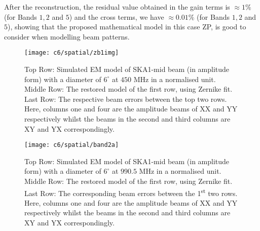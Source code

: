 After the reconstruction, the residual value obtained in the gain terms is $\approx 1 \%$ (for Bands $1, 2$ and $5$) and the cross terms, we have $ \approx 0.01 \%$ (for Bands $1, 2$ and $5$), showing that the proposed mathematical model in this case ZP, is good to consider when modelling beam patterns.
\begin{figure}
\begin{minipage}[H]{\linewidth}
\centering
\texttt{[image: c6/spatial/zb1img]}
\caption{\label{fig:band1} Top Row: Simulated EM model of SKA1-mid beam (in amplitude form) with a diameter of $6^\circ$ at $450$ MHz in a normalised unit. Middle Row: The restored model of the first row, using Zernike fit. Last Row: The respective beam errors between the top two rows.
Here, columns one and four are the amplitude beams of XX and YY respectively whilst the beams in the second and third columns are XY and YX correspondingly.}
\end{minipage}
\end{figure}
\FloatBarrier


\begin{figure}
\begin{minipage}[H]{\linewidth}
\centering
\texttt{[image: c6/spatial/band2a]}
\caption{\label{fig:band2} Top Row: Simulated EM model of SKA1-mid beam (in amplitude form) with a diameter of $6^\circ$ at $990.5$ MHz in a normalised unit. Middle Row: The restored model of the first row, using Zernike fit.
Last Row: The corresponding beam errors between the 1\textsuperscript{st} two rows.
Here, columns one and four are the amplitude beams of XX and YY respectively whilst the beams in the second and third columns are XY and YX correspondingly.}
\end{minipage}
\end{figure}
\FloatBarrier


